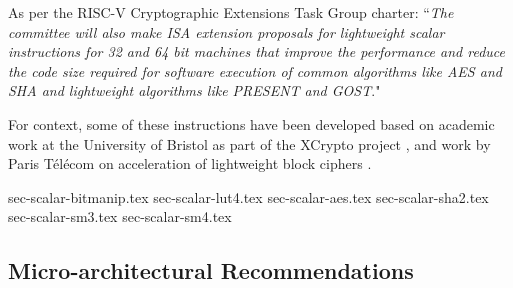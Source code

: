 
As per the RISC-V Cryptographic Extensions Task Group charter:
``{\em The committee will also make ISA extension proposals for lightweight
scalar instructions for 32 and 64 bit machines that improve the performance
and reduce the code size required for software execution of common algorithms
like AES and SHA and lightweight algorithms like PRESENT and GOST}."

\bigskip

For context, some of these instructions have been developed based on academic
work at the University of Bristol as part of the XCrypto project
\cite{MPP:19},
and work by
Paris T\'{e}l\'{e}com on acceleration of lightweight block ciphers
\cite{TGMGD:19}.



{sec-scalar-bitmanip.tex}
{sec-scalar-lut4.tex}
{sec-scalar-aes.tex}
{sec-scalar-sha2.tex}
{sec-scalar-sm3.tex}
{sec-scalar-sm4.tex}


\newpage
\subsection{Micro-architectural Recommendations}



